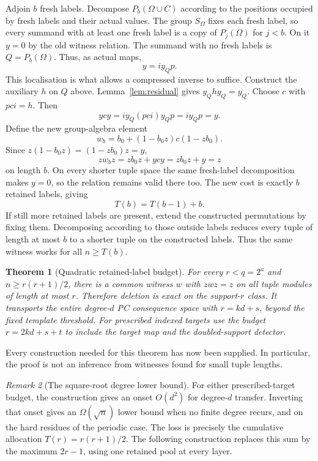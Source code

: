 \documentclass[11pt,a4paper]{article}
\newtheorem{theorem}{Theorem}[section]
\theoremstyle{definition}\newtheorem{definition}[theorem]{Definition}
\theoremstyle{remark}\newtheorem{remark}[theorem]{Remark}
\begin{document}
Adjoin $b$ fresh labels. Decompose $P_b(\Omega\cup C)$ according to the positions occupied by fresh labels and their actual values. The group $S_\Omega$ fixes each fresh label, so every summand with at least one fresh label is a copy of $P_j(\Omega)$ for $j<b$. On it $y=0$ by the old witness relation. The summand with no fresh labels is $Q=P_b(\Omega)$. Thus, as actual maps,
\[y=i y_Q p.\]
This localisation is what allows a compressed inverse to suffice. Construct the auxiliary $h$ on $Q$ above. Lemma~\ref{lem:residual} gives $y_Qhy_Q=y_Q$. Choose $c$ with $pci=h$. Then
\[ycy=i y_Q(pci)y_Qp=i y_Qp=y.\]
Define the new group-algebra element
\[w_b=b_0+(1-b_0z)c(1-zb_0).\]
Since $z(1-b_0z)=(1-zb_0)z=y$,
\[zw_bz=zb_0z+ycy=zb_0z+y=z\]
on length $b$. On every shorter tuple space the same fresh-label decomposition makes $y=0$, so the relation remains valid there too. The new cost is exactly $b$ retained labels, giving
\[T(b)=T(b-1)+b.\]
If still more retained labels are present, extend the constructed permutations by fixing them. Decomposing according to those outside labels reduces every tuple of length at most $b$ to a shorter tuple on the constructed labels. Thus the same witness works for all $n\ge T(b)$.

\begin{theorem}[Quadratic retained-label budget]
For every $r<q=2^a$ and $n\ge r(r+1)/2$, there is a common witness $w$ with $zwz=z$ on all tuple modules of length at most $r$. Therefore deletion is exact on the support-$r$ class. It transports the
entire degree-$d$ PC consequence space with $r=kd+s$, beyond the fixed
template threshold. For prescribed indexed targets use the budget
$r=2kd+s+t$ to include the target map and the doubled-support detector.
\end{theorem}
Every construction needed for this theorem has now been supplied. In particular, the proof is not an inference from witnesses found for small tuple lengths.


\begin{remark}[The square-root degree lower bound]
For either prescribed-target budget, the construction gives an onset
$O(d^2)$ for degree-$d$ transfer.
Inverting that onset gives an $\Omega(\sqrt n)$ lower bound when no
finite degree recurs, and on the hard residues of the periodic case.
The loss is precisely the cumulative allocation $T(r)=r(r+1)/2$.
The following construction replaces this sum by the maximum $2r-1$,
using one retained pool at every layer.
\end{remark}
\end{document}

